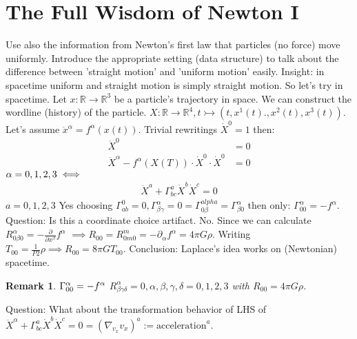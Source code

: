 \documentclass[10pt, oneside]{article}
\newcommand{\R}{\mathbb{R}}
\newtheorem{remark}{Remark}
\begin{document}
  \section{The Full Wisdom of Newton I}
     Use also the information from Newton's first law that particles (no force) move uniformly. Introduce the appropriate setting (data structure) to talk about the difference between 'straight motion' and 'uniform motion' easily. Insight: in spacetime uniform and straight motion is simply straight motion.
     So let's try in spacetime. Let $x: \R \to \R^3$ be a particle's trajectory in space. We can construct the wordline (history) of the particle. $X:\R \to \R^4, t \rightarrowtail (t, x^1(t)., x^2(t),x^3(t))$. Let's assume $\ddot{x}^\alpha = f^\alpha (x(t))$.
     Trivial rewritings $\dot{X}^0 = 1$ then:
     \begin{align*}
        \ddot{X}^0 &= 0 \\
        \ddot{X}^\alpha - f^\alpha(X(T))\cdot \dot{X}^0 \cdot \dot{X}^0 &= 0
     \end{align*}
     $\alpha = 0,1,2,3 \\
     \iff$
     \begin{align*}
        \ddot{X}^a + \Gamma^a_{bc} \dot{X}^b \dot{X}^c = 0
     \end{align*}
     $a = 0,1,2,3$
     Yes choosing $\Gamma^0_{ab} = 0, \Gamma^\alpha_{\beta \gamma} = 0 = \Gamma^{alpha}_{0 \beta} = \Gamma^\alpha_{\beta 0}$ then only: $\Gamma^\alpha_{00} = -f^\alpha$.
     Question: Is this a coordinate choice artifact. No. Since we can calculate $R^\alpha_{0 \beta 0} = - \frac{\partial}{\partial x^\beta} f^\alpha$
     $\implies R_{00} = R^m_{0m0} = -\partial_\alpha f^\alpha = 4 \pi G \rho$.
     Writing $T_{00} = \frac{1}{P2} \rho \implies R_{00} = 8 \pi G T_{00}$. Conclusion: Laplace's idea works on (Newtonian) spacetime.
     \begin{remark}
     $\Gamma^\alpha_{00} = -f^\alpha \\$
     $R^\alpha_{\beta \gamma \delta }=0,  \alpha, \beta,\gamma,\delta=0,1,2,3$ with $R_{00} = 4 \pi G \rho$.
     \end{remark}
     Question: What about the transformation behavior of LHS of $\ddot{X}^\alpha + \Gamma^a_{b c} \dot{X}^b \dot{X}^c = 0 = (\nabla_{v_{x}} v_{x} )^a := \text{acceleration}^a$.
\end{document}
